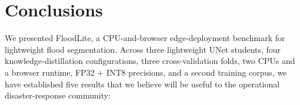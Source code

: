 
\section{Conclusions}
\label{sec:conclusion}

We presented FloodLite, a CPU-and-browser edge-deployment benchmark for lightweight flood segmentation. Across three lightweight UNet students, four knowledge-distillation configurations, three cross-validation folds, two CPUs and a browser runtime, FP32 $+$ INT8 precisions, and a second training corpus, we have established five results that we believe will be useful to the operational disaster-response community:

